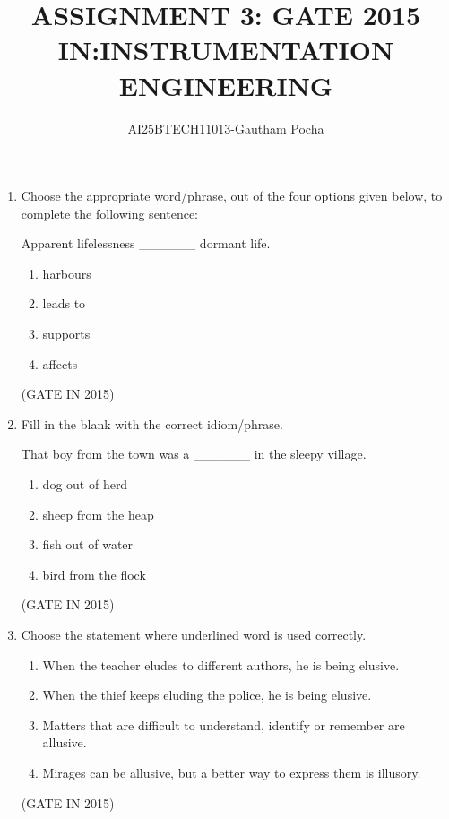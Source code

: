 \documentclass[journal]{IEEEtran}
\begin{document}
\title{
ASSIGNMENT 3: GATE 2015 \\
IN:INSTRUMENTATION ENGINEERING}
\author{AI25BTECH11013-Gautham Pocha}
\maketitle
\renewcommand{\thefigure}{\theenumi}
\renewcommand{\thetable}{\theenumi}

\begin{enumerate}
\item Choose the appropriate word/phrase, out of the four options given below, to complete the following sentence:

Apparent lifelessness \_\_\_\_\_\_ dormant life.

\begin{multicols}{4}
\begin{enumerate}
\item harbours
\item leads to
\item supports
\item affects
\end{enumerate}
  \end{multicols} \hfill(GATE IN 2015)

\item Fill in the blank with the correct idiom/phrase.

That boy from the town was a \_\_\_\_\_\_ in the sleepy village.

\begin{multicols}{2}
\begin{enumerate}
\item dog out of herd
\item sheep from the heap
\item fish out of water
\item bird from the flock
\end{enumerate}
  \end{multicols} \hfill(GATE IN 2015)

\item Choose the statement where underlined word is used correctly.

\begin{enumerate}
\item When the teacher eludes to different authors, he is being elusive.
\item When the thief keeps eluding the police, he is being elusive.
\item Matters that are difficult to understand, identify or remember are allusive.
\item Mirages can be allusive, but a better way to express them is illusory.
\end{enumerate}
\hfill(GATE IN 2015)


\end{enumerate}
\end{document}
